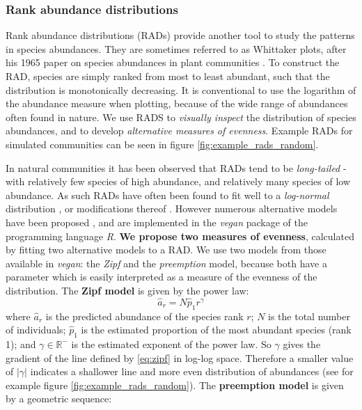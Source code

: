 \subsubsection{Rank abundance distributions}
\label{sec:define_rads}

Rank abundance distributions (RADs) provide another tool to study the patterns in species abundances. They are sometimes referred to as Whittaker plots, after his 1965 paper on species abundances in plant communities \cite{whittaker1965dominance}. To construct the RAD, species are simply ranked from most to least abundant, such that the distribution is monotonically decreasing. It is conventional to use the logarithm of the abundance measure when plotting, because of the wide range of abundances often found in nature. We use RADS to \emph{visually inspect} the distribution of species abundances, and to develop \emph{alternative measures of evenness}. Example RADs for simulated communities can be seen in figure \ref{fig:example_rads_random}.

In natural communities it has been observed that RADs tend to be \emph{long-tailed} - with relatively few species of high abundance, and relatively many species of low abundance. As such RADs have often been found to fit well to a \emph{log-normal} distribution \cite{lurgi2015effects,whittaker1965dominance}, or modifications thereof \cite{mcgill2007species}. However numerous alternative models have been proposed \cite{wilson1991methods}, and are implemented in the \emph{vegan} package \cite{oksanen2007vegan} of the programming language \emph{R}. \textbf{We propose two measures of evenness}, calculated by fitting two alternative models to a RAD. We use two models from those available in \emph{vegan}: the \emph{Zipf} and the \emph{preemption} model, because both have a parameter which is easily interpreted as a measure of the evenness of the distribution. The \textbf{Zipf model} is given by the power law: 
\begin{equation}
\hat{a}_r = N\hat{p}_1r^{\gamma}
\label{eq:zipf}
\end{equation}
%
where $\hat{a}_r$ is the predicted abundance of the species rank $r$; $N$ is the total number of individuals; $\hat{p}_1$ is the estimated proportion of the most abundant species (rank 1); and $\gamma \in \mathbb{R}^-$ is the estimated exponent of the power law. So $\gamma$ gives the gradient of the line defined by \eqref{eq:zipf} in log-log space. Therefore a smaller value of $\left| \gamma \right|$ indicates a shallower line and more even distribution of abundances (see for example figure \ref{fig:example_rads_random}). The \textbf{preemption model} is given by a geometric sequence:


